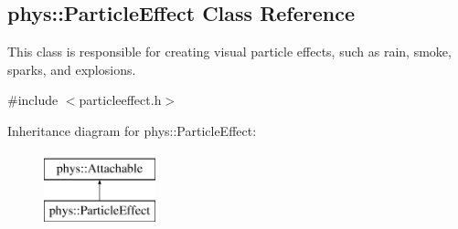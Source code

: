 \hypertarget{classphys_1_1ParticleEffect}{
\subsection{phys::ParticleEffect Class Reference}
\label{d2/d69/classphys_1_1ParticleEffect}
}


This class is responsible for creating visual particle effects, such as rain, smoke, sparks, and explosions.  




{\ttfamily \#include $<$particleeffect.h$>$}

Inheritance diagram for phys::ParticleEffect:\begin{figure}[H]
\begin{center}
\leavevmode
\includegraphics[height=2.000000cm]{d2/d69/classphys_1_1ParticleEffect}
\end{center}
\end{figure}
